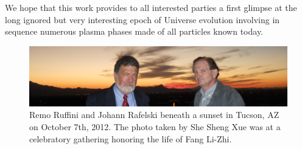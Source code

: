 \documentclass[universe,article,submit,moreauthors,pdftex,a4paper]{Definitions/mdpi}
\begin{document}
We hope that this work provides to all interested parties a first glimpse at the long ignored but very interesting epoch of Universe evolution involving in sequence numerous plasma phases made of all particles known today. 
\begin{figure}[H]
\centering
\includegraphics[width=\textwidth]{./plots/remo_sunset}
\caption{Remo Ruffini and Johann Rafelski beneath a sunset in Tucson, AZ on October 7th, 2012. The photo taken by She Sheng Xue was at a celebratory gathering honoring the life of Fang Li-Zhi.}
\label{remo_sunset}
\end{figure}
%

\end{document}
